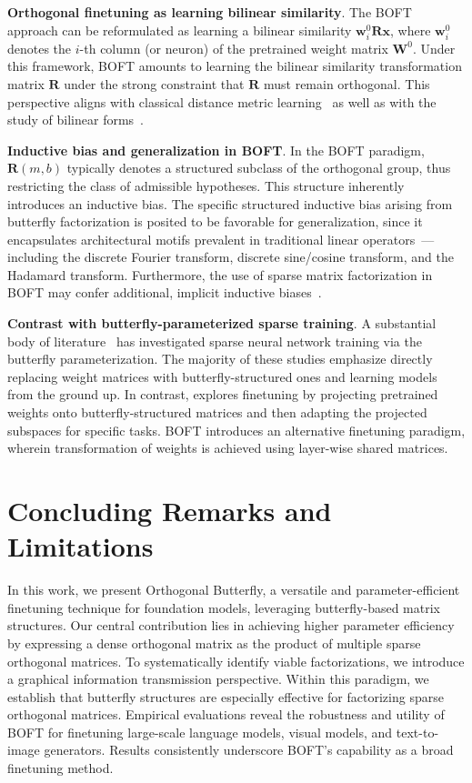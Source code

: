 \textbf{Orthogonal finetuning as learning bilinear similarity}. The BOFT approach can be reformulated as learning a bilinear similarity $\bm{w}^0_i\bm{R}\bm{x}$, where $\bm{w}^0_i$ denotes the $i$-th column (or neuron) of the pretrained weight matrix $\bm{W}^0$. Under this framework, BOFT amounts to learning the bilinear similarity transformation matrix $\bm{R}$ under the strong constraint that $\bm{R}$ must remain orthogonal. This perspective aligns with classical distance metric learning~\cite{xing2002distance} as well as with the study of bilinear forms~\cite{roman2005advanced}.

\textbf{Inductive bias and generalization in BOFT}. In the BOFT paradigm, $\bm{R}(m,b)$ typically denotes a structured subclass of the orthogonal group, thus restricting the class of admissible hypotheses. This structure inherently introduces an inductive bias. The specific structured inductive bias arising from butterfly factorization is posited to be favorable for generalization, since it encapsulates architectural motifs prevalent in traditional linear operators~\cite{dao2019kaleidoscope}—including the discrete Fourier transform, discrete sine/cosine transform, and the Hadamard transform. Furthermore, the use of sparse matrix factorization in BOFT may confer additional, implicit inductive biases~\cite{gunasekar2017implicit,li2018algorithmic,liu2019neural}.

\textbf{Contrast with butterfly-parameterized sparse training}. A substantial body of literature~\cite{dao2019learning,dao2019kaleidoscope,chen2022pixelated,dao2022monarch} has investigated sparse neural network training via the butterfly parameterization. The majority of these studies emphasize directly replacing weight matrices with butterfly-structured ones and learning models from the ground up. In contrast, \cite{dao2022monarch} explores finetuning by projecting pretrained weights onto butterfly-structured matrices and then adapting the projected subspaces for specific tasks. BOFT introduces an alternative finetuning paradigm, wherein transformation of weights is achieved using layer-wise shared matrices.



\section{Concluding Remarks and Limitations}

In this work, we present Orthogonal Butterfly, a versatile and parameter-efficient finetuning technique for foundation models, leveraging butterfly-based matrix structures. Our central contribution lies in achieving higher parameter efficiency by expressing a dense orthogonal matrix as the product of multiple sparse orthogonal matrices. To systematically identify viable factorizations, we introduce a graphical information transmission perspective. Within this paradigm, we establish that butterfly structures are especially effective for factorizing sparse orthogonal matrices. Empirical evaluations reveal the robustness and utility of BOFT for finetuning large-scale language models, visual models, and text-to-image generators. Results consistently underscore BOFT's capability as a broad finetuning method.

